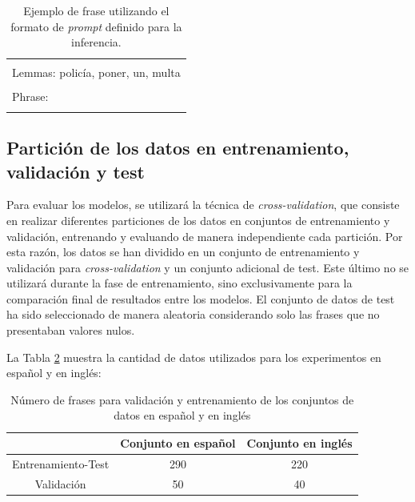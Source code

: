 \documentclass[11pt,spanish,listoffigures,listoftables]{tfgetsinf}
\begin{document}
\begin{table}[!h]
\caption{Ejemplo de frase utilizando el formato de \textit{prompt} definido para la inferencia.}
\begin{center}
\begin{tabular}{ | l | }
\hline
	\\
	Lemmas: policía, poner, un, multa \\
	\\
	Phrase: \\
	\\
\hline
\end{tabular}
\end{center}
\label{tab: formatoInferencia}
\end{table}

\subsection{Partición de los datos en entrenamiento, validación y test}

Para evaluar los modelos, se utilizará la técnica de \textit{cross-validation}, que consiste en realizar diferentes particiones de los datos en conjuntos de entrenamiento y validación, entrenando y evaluando de manera independiente cada partición. Por esta razón, los datos se han dividido en un conjunto de entrenamiento y validación para \textit{cross-validation} y un conjunto adicional de test. Este último no se utilizará durante la fase de entrenamiento, sino exclusivamente para la comparación final de resultados entre los modelos. El conjunto de datos de test ha sido seleccionado de manera aleatoria considerando solo las frases que no presentaban valores nulos.

La Tabla \ref{tab:frases} muestra la cantidad de datos utilizados para los experimentos en español y en inglés:

\begin{table}[!h]
\caption{Número de frases para validación y entrenamiento de los conjuntos de datos en español y en inglés}
\begin{center}
\begin{tabular}{  c || c  c  }
	\ & Conjunto en español & Conjunto en inglés \\
	\hline
	Entrenamiento-Test & 290 & 220 \\
	Validación & 50 & 40
\end{tabular}
\end{center}
\label{tab:frases}
\end{table}
\end{document}
